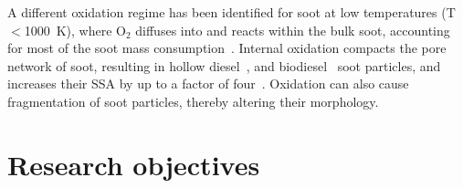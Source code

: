 
A different oxidation regime has been identified for soot at low temperatures (T$<$1000~K), where O$_2$ diffuses into and reacts within the bulk soot, accounting for most of the soot mass consumption~\citep{ma2013soot}. Internal oxidation compacts the pore network of soot, resulting in hollow diesel~\cite{ishiguro1991microstructural}, and biodiesel~\citep{song2006examination} soot particles, and increases their SSA by up to a factor of four~\cite{ishiguro1991microstructural}. Oxidation can also cause fragmentation of soot particles, thereby altering their morphology.





\section{Research objectives}

